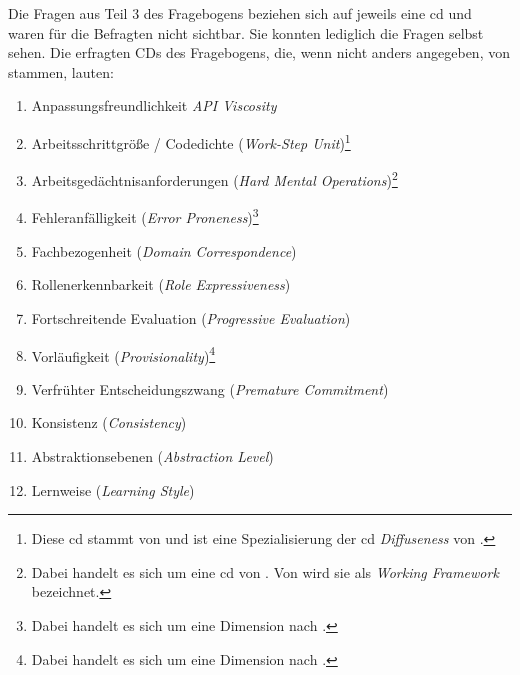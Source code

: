 Die Fragen aus Teil 3 des Fragebogens beziehen sich auf jeweils eine \gls{cd} und waren für die Befragten nicht sichtbar. Sie konnten lediglich die Fragen selbst sehen. Die erfragten CDs des Fragebogens, die, wenn nicht anders angegeben, von \cite{Anonymous:9HSMlhmF} stammen, lauten:

\begin{enumerate}
\itemsep1pt\parskip0pt
  \item Anpassungsfreundlichkeit \textit{API Viscosity}
  \item Arbeitsschrittgröße / Codedichte (\textit{Work-Step Unit})\footnote{Diese \gls{cd} stammt von \cite{Anonymous:9HSMlhmF} und ist eine Spezialisierung der \gls{cd} \textit{Diffuseness} von \cite{161956}.}
  \item Arbeitsgedächtnisanforderungen (\textit{Hard Mental Operations})\footnote{Dabei handelt es sich um eine \gls{cd} von \cite{161956}. Von \cite{Anonymous:9HSMlhmF} wird sie als \textit{Working Framework} bezeichnet.}
  \item Fehleranfälligkeit (\textit{Error Proneness})\footnote{Dabei handelt es sich um eine Dimension nach \cite{161956}.}
  \item Fachbezogenheit (\textit{Domain Correspondence})
  \item Rollenerkennbarkeit (\textit{Role Expressiveness})
  \item Fortschreitende Evaluation (\textit{Progressive Evaluation})
  \item Vorläufigkeit (\textit{Provisionality})\footnote{Dabei handelt es sich um eine Dimension nach \cite{161956}.}
  \item Verfrühter Entscheidungszwang (\textit{Premature Commitment})
  \item Konsistenz (\textit{Consistency})
  \item Abstraktionsebenen (\textit{Abstraction Level})
  \item Lernweise (\textit{Learning Style})
\end{enumerate}



